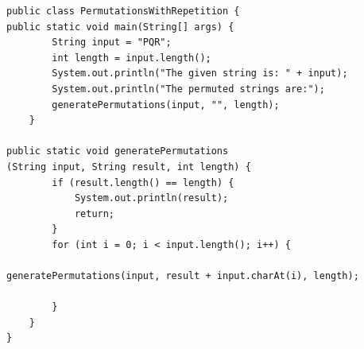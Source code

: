 \begin{verbatim}
public class PermutationsWithRepetition {
public static void main(String[] args) {
        String input = "PQR";
        int length = input.length();
        System.out.println("The given string is: " + input);
        System.out.println("The permuted strings are:");
        generatePermutations(input, "", length);
    }
    
public static void generatePermutations
(String input, String result, int length) {
        if (result.length() == length) {
            System.out.println(result);
            return;
        }
        for (int i = 0; i < input.length(); i++) {
            
generatePermutations(input, result + input.charAt(i), length);
        
        }
    }
}
\end{verbatim}